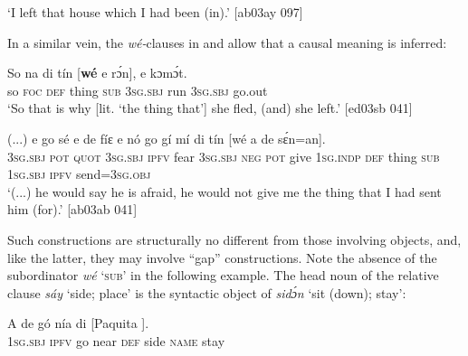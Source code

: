 \glt ‘I left that house which I had been (in).’ [ab03ay 097]
\z


\ea%
    \label{ex:key:1440}
\z\z

In a similar vein, the \textit{wé-}clauses in  and  allow that a causal meaning is inferred:


\ea%
    \label{ex:key:1441}
    \gll So  na  di  tín    [\textbf{wé}  e    rɔ́n],  e  kɔmɔ́t.\\
so  \textsc{foc}  \textsc{def}  thing   \textsc{sub}  \textsc{3sg.sbj}  run  \textsc{3sg.sbj}  go.out\\

\glt ‘So that is why [lit. ‘the thing that’] she fled, (and) she left.’ [ed03sb 041]
\z


\ea%
    \label{ex:key:1442}
    \gll (...)  e    go  sé    e    de  fíɛ  e    nó  go  gí  mí
di  tín    [wé    a    de  sɛ́n=an].\\
{}  \textsc{3sg.sbj}  \textsc{pot}  \textsc{quot}    \textsc{3sg.sbj}  \textsc{ipfv}  fear  \textsc{3sg.sbj}  \textsc{neg}  \textsc{pot}  give  \textsc{1sg.indp}
\textsc{def}  thing   \textsc{sub}    \textsc{1sg.sbj}  \textsc{ipfv}  send=\textsc{3sg.obj}\\

\glt ‘(...) he would say he is afraid, he would not give me the thing that I had sent 
him (for).’ [ab03ab 041]
\z

Such constructions are structurally no different from those involving objects, and, like the latter, they may involve “gap” constructions. Note the absence of the subordinator \textit{wé} ‘\textsc{sub}’ in the following example. The head noun of the relative clause \textit{sáy} ‘side; place’ is the syntactic object of \textit{sidɔ́n} ‘sit (down); stay’: 


\ea%
    \label{ex:key:1443}
    \gll A    de  gó  nía    di    [Paquita  ].\\
\textsc{1sg.sbj}  \textsc{ipfv}  go  near    \textsc{def}  side   \textsc{name}  stay\\

